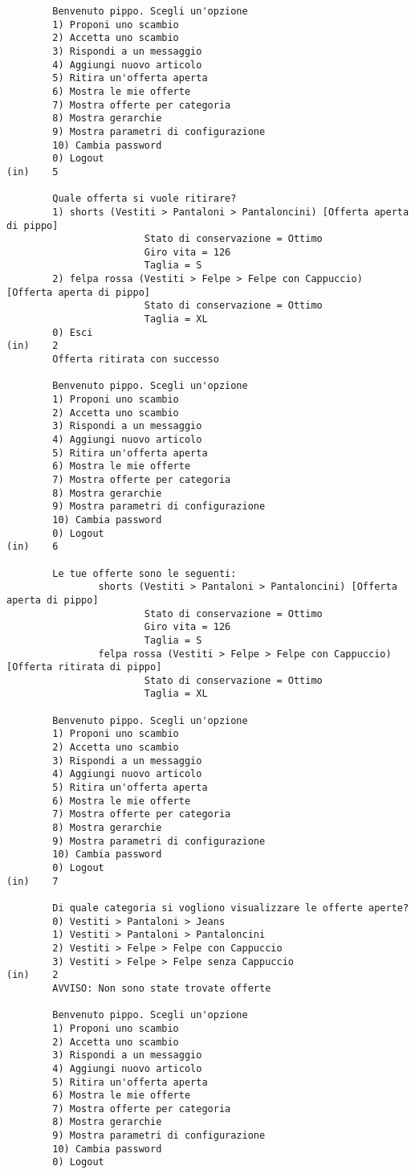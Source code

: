 \begin{lstlisting}
        Benvenuto pippo. Scegli un'opzione
        1) Proponi uno scambio
        2) Accetta uno scambio
        3) Rispondi a un messaggio
        4) Aggiungi nuovo articolo
        5) Ritira un'offerta aperta
        6) Mostra le mie offerte
        7) Mostra offerte per categoria
        8) Mostra gerarchie
        9) Mostra parametri di configurazione
        10) Cambia password
        0) Logout
(in)    5

        Quale offerta si vuole ritirare?
        1) shorts (Vestiti > Pantaloni > Pantaloncini) [Offerta aperta di pippo]
                        Stato di conservazione = Ottimo
                        Giro vita = 126
                        Taglia = S
        2) felpa rossa (Vestiti > Felpe > Felpe con Cappuccio) [Offerta aperta di pippo]
                        Stato di conservazione = Ottimo
                        Taglia = XL
        0) Esci
(in)    2
        Offerta ritirata con successo

        Benvenuto pippo. Scegli un'opzione
        1) Proponi uno scambio
        2) Accetta uno scambio
        3) Rispondi a un messaggio
        4) Aggiungi nuovo articolo
        5) Ritira un'offerta aperta
        6) Mostra le mie offerte
        7) Mostra offerte per categoria
        8) Mostra gerarchie
        9) Mostra parametri di configurazione
        10) Cambia password
        0) Logout
(in)    6

        Le tue offerte sono le seguenti: 
                shorts (Vestiti > Pantaloni > Pantaloncini) [Offerta aperta di pippo]
                        Stato di conservazione = Ottimo
                        Giro vita = 126
                        Taglia = S
                felpa rossa (Vestiti > Felpe > Felpe con Cappuccio) [Offerta ritirata di pippo]
                        Stato di conservazione = Ottimo
                        Taglia = XL

        Benvenuto pippo. Scegli un'opzione
        1) Proponi uno scambio
        2) Accetta uno scambio
        3) Rispondi a un messaggio
        4) Aggiungi nuovo articolo
        5) Ritira un'offerta aperta
        6) Mostra le mie offerte
        7) Mostra offerte per categoria
        8) Mostra gerarchie
        9) Mostra parametri di configurazione
        10) Cambia password
        0) Logout
(in)    7

        Di quale categoria si vogliono visualizzare le offerte aperte?
        0) Vestiti > Pantaloni > Jeans
        1) Vestiti > Pantaloni > Pantaloncini
        2) Vestiti > Felpe > Felpe con Cappuccio
        3) Vestiti > Felpe > Felpe senza Cappuccio
(in)    2
        AVVISO: Non sono state trovate offerte

        Benvenuto pippo. Scegli un'opzione
        1) Proponi uno scambio
        2) Accetta uno scambio
        3) Rispondi a un messaggio
        4) Aggiungi nuovo articolo
        5) Ritira un'offerta aperta
        6) Mostra le mie offerte
        7) Mostra offerte per categoria
        8) Mostra gerarchie
        9) Mostra parametri di configurazione
        10) Cambia password
        0) Logout
\end{lstlisting}

